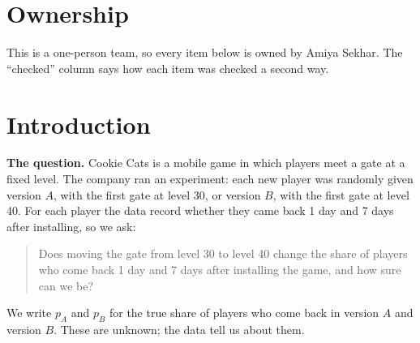 \documentclass[11pt]{article}
\theoremstyle{definition}
\theoremstyle{remark}
\begin{document}
\section*{Ownership}
This is a one-person team, so every item below is owned by Amiya Sekhar. The ``checked'' column says how each
item was checked a second way.
\begin{center}
\end{center}

\tableofcontents
\clearpage

\section{Introduction}\label{sec:intro}

\textbf{The question.} Cookie Cats is a mobile game in which players meet a gate at a fixed level. The
company ran an experiment: each new player was randomly given version $A$, with the first gate at level 30, or
version $B$, with the first gate at level 40. For each player the data record whether they came back 1 day and
7 days after installing, so we ask:
\begin{quote}
Does moving the gate from level 30 to level 40 change the share of players who come back 1 day and 7 days after
installing the game, and how sure can we be?
\end{quote}
We write $p_A$ and $p_B$ for the true share of players who come back in version $A$ and version $B$. These are
unknown; the data tell us about them.
\end{document}
